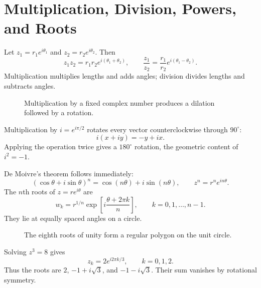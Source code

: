 \section{Multiplication, Division, Powers, and Roots}
\label{sec:ch5-geometry-operations}

Let $z_1=r_1e^{i\theta_1}$ and $z_2=r_2e^{i\theta_2}$. Then
\[
z_1z_2=r_1r_2e^{i(\theta_1+\theta_2)},
\qquad
\frac{z_1}{z_2}=\frac{r_1}{r_2}e^{i(\theta_1-\theta_2)}.
\]
Multiplication multiplies lengths and adds angles; division divides lengths and subtracts angles.

\begin{figure}[htbp]
\centering

\caption{Multiplication by a fixed complex number produces a dilation followed by a rotation.}
\label{fig:ch5-multiplication}
\end{figure}

Multiplication by $i=e^{i\pi/2}$ rotates every vector counterclockwise through $90^\circ$:
\[
i(x+iy)=-y+ix.
\]
Applying the operation twice gives a $180^\circ$ rotation, the geometric content of $i^2=-1$.

De Moivre's theorem follows immediately:
\[
(\cos\theta+i\sin\theta)^n=\cos(n\theta)+i\sin(n\theta),
\qquad z^n=r^ne^{in\theta}.
\]
The $n$th roots of $z=re^{i\theta}$ are
\[
w_k=r^{1/n}\exp\!\left[i\frac{\theta+2\pi k}{n}\right],
\qquad k=0,1,\ldots,n-1.
\]
They lie at equally spaced angles on a circle.

\begin{figure}[htbp]
\centering

\caption{The eighth roots of unity form a regular polygon on the unit circle.}
\label{fig:ch5-roots-unity}
\end{figure}

\begin{workedexample}
Solving $z^3=8$ gives
\[
z_k=2e^{i2\pi k/3},\qquad k=0,1,2.
\]
Thus the roots are $2$, $-1+i\sqrt3$, and $-1-i\sqrt3$. Their sum vanishes by rotational symmetry.
\end{workedexample}
